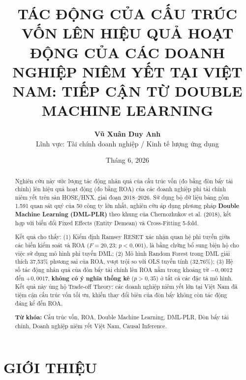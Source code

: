 \documentclass[12pt,a4paper]{article}
\title{\textbf{TÁC ĐỘNG CỦA CẤU TRÚC VỐN LÊN HIỆU QUẢ HOẠT ĐỘNG CỦA CÁC DOANH NGHIỆP NIÊM YẾT TẠI VIỆT NAM: TIẾP CẬN TỪ DOUBLE MACHINE LEARNING}}
\author{\textbf{Vũ Xuân Duy Anh} \\ Lĩnh vực: Tài chính doanh nghiệp / Kinh tế lượng ứng dụng}
\date{Tháng 6, 2026}
\begin{document}
\maketitle

\begin{abstract}
Nghiên cứu này ước lượng tác động nhân quả của cấu trúc vốn (đo bằng đòn bẩy tài chính) lên hiệu quả hoạt động (đo bằng ROA) của các doanh nghiệp phi tài chính niêm yết trên sàn HOSE/HNX, giai đoạn 2018--2026. Sử dụng bộ dữ liệu bảng gồm 1.591 quan sát quý của 50 công ty lớn nhất, nghiên cứu áp dụng phương pháp \textbf{Double Machine Learning (DML-PLR)} theo khung của Chernozhukov et al. (2018), kết hợp với biến đổi Fixed Effects (Entity Demean) và Cross-Fitting 5-fold.

Kết quả cho thấy: (1) Kiểm định Ramsey RESET xác nhận quan hệ phi tuyến giữa các biến kiểm soát và ROA ($F = 20,23$; $p < 0,001$), là bằng chứng bổ sung biện hộ cho việc sử dụng mô hình phi tuyến DML; (2) Mô hình Random Forest trong DML giải thích 37,53\% phương sai của ROA, vượt trội so với OLS tuyến tính (32,76\%); (3) Hệ số tác động nhân quả của đòn bẩy tài chính lên ROA nằm trong khoảng từ $-0,0012$ đến $+0,0017$, \textbf{không có ý nghĩa thống kê} ($p > 0,35$) ở tất cả các đặc tả mô hình. Kết quả này ủng hộ Trade-off Theory: các doanh nghiệp niêm yết lớn tại Việt Nam đã tiệm cận cấu trúc vốn tối ưu, khiến thay đổi biên của đòn bẩy không còn tác động đáng kể đến ROA.

\textbf{Từ khóa:} Cấu trúc vốn, ROA, Double Machine Learning, DML-PLR, Đòn bẩy tài chính, Doanh nghiệp niêm yết Việt Nam, Causal Inference.
\end{abstract}

\newpage

\section{GIỚI THIỆU}
\end{document}
